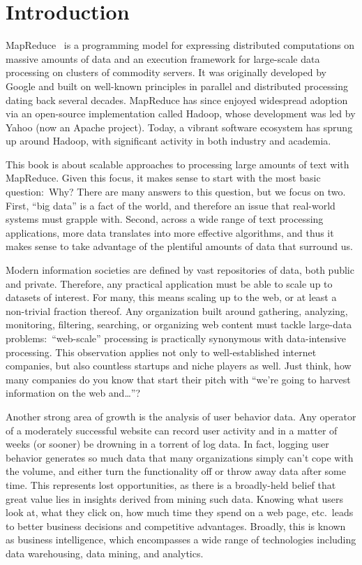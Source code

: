 \chapter{Introduction}
\label{chapter1}

MapReduce~\cite{Dean_Ghemawat_OSDI2004} is a programming model for
expressing distributed computations on massive amounts of data and an
execution framework for large-scale data processing on clusters of
commodity servers.  It was originally developed by Google and built on
well-known principles in parallel and distributed processing dating
back several decades.  MapReduce has since enjoyed widespread adoption
via an open-source implementation called Hadoop, whose development was
led by Yahoo (now an Apache project).  Today, a vibrant software
ecosystem has sprung up around Hadoop, with significant activity in
both industry and academia.

This book is about scalable approaches to processing large amounts of
text with MapReduce.  Given this focus, it makes sense to start with
the most basic question:\ Why?  There are many answers to this
question, but we focus on two.  First, ``big data'' is a fact of the
world, and therefore an issue that real-world systems must grapple
with.  Second, across a wide range of text processing applications,
more data translates into more effective algorithms, and thus it makes
sense to take advantage of the plentiful amounts of data that surround
us.

Modern information societies are defined by vast repositories of data,
both public and private.  Therefore, any practical application must be
able to scale up to datasets of interest.  For many, this means
scaling up to the web, or at least a non-trivial fraction thereof.
Any organization built around gathering, analyzing, monitoring,
filtering, searching, or organizing web content must tackle large-data
problems:\ ``web-scale'' processing is practically synonymous with
data-intensive processing.  This observation applies not only to
well-established internet companies, but also countless startups and
niche players as well.  Just think, how many companies do you know
that start their pitch with ``we're going to harvest information on
the web and\ldots''?

Another strong area of growth is the analysis of user behavior data.
Any operator of a moderately successful website can record user
activity and in a matter of weeks (or sooner) be drowning in a torrent
of log data.  In fact, logging user behavior generates so much data
that many organizations simply can't cope with the volume, and either
turn the functionality off or throw away data after some time.  This
represents lost opportunities, as there is a broadly-held belief that
great value lies in insights derived from mining such data.  Knowing
what users look at, what they click on, how much time they spend on a
web page, etc.\ leads to better business decisions and competitive
advantages.  Broadly, this is known as business intelligence, which
encompasses a wide range of technologies including data warehousing,
data mining, and analytics.

